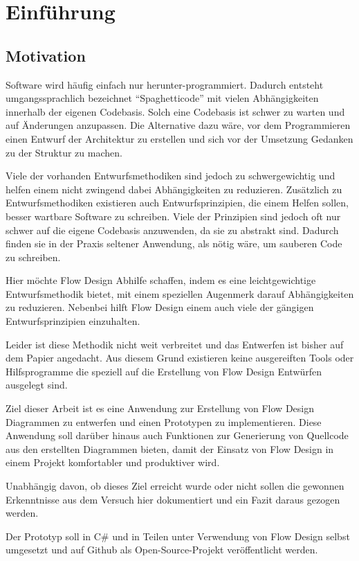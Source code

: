 
\chapter{Einführung}

\section{Motivation}

Software wird häufig einfach nur herunter-programmiert. Dadurch entsteht
umgangssprachlich bezeichnet \enquote{Spaghetticode} mit vielen Abhängigkeiten innerhalb
der eigenen Codebasis. Solch eine Codebasis ist schwer zu warten und auf
Änderungen anzupassen. Die Alternative dazu wäre, vor dem Programmieren einen
Entwurf der Architektur zu erstellen und sich vor der Umsetzung Gedanken zu
der Struktur zu machen.

Viele der vorhanden Entwurfsmethodiken sind jedoch zu schwergewichtig und helfen
einem nicht zwingend dabei Abhängigkeiten zu reduzieren.
Zusätzlich zu Entwurfsmethodiken existieren auch Entwurfsprinzipien, die
einem Helfen sollen, besser wartbare Software zu schreiben. Viele der
Prinzipien sind jedoch oft nur schwer auf die eigene
Codebasis anzuwenden, da sie zu abstrakt sind.
Dadurch finden sie in der Praxis seltener Anwendung, als nötig wäre, um sauberen
Code zu schreiben.

Hier möchte Flow Design Abhilfe schaffen, indem es eine leichtgewichtige
Entwurfsmethodik bietet, mit einem speziellen Augenmerk darauf Abhängigkeiten
zu reduzieren. Nebenbei hilft Flow Design einem auch viele der gängigen Entwurfsprinzipien einzuhalten.

Leider ist diese Methodik nicht weit verbreitet und das
Entwerfen ist bisher auf dem Papier angedacht. Aus diesem Grund existieren keine
ausgereiften Tools oder Hilfsprogramme die speziell auf die Erstellung
von Flow Design Entwürfen ausgelegt sind. 

Ziel dieser Arbeit ist es eine Anwendung zur Erstellung von Flow Design Diagrammen 
zu entwerfen und einen Prototypen zu implementieren. Diese Anwendung soll darüber hinaus auch
Funktionen zur Generierung von Quellcode aus den erstellten Diagrammen bieten, damit
der Einsatz von Flow Design in einem Projekt komfortabler und produktiver wird.

Unabhängig davon, ob dieses Ziel erreicht wurde oder nicht sollen die gewonnen
Erkenntnisse aus dem Versuch hier dokumentiert und ein Fazit daraus gezogen werden.

Der Prototyp soll in C\# und in Teilen unter Verwendung von Flow Design selbst umgesetzt und auf
Github als  Open-Source-Projekt veröffentlicht werden.



